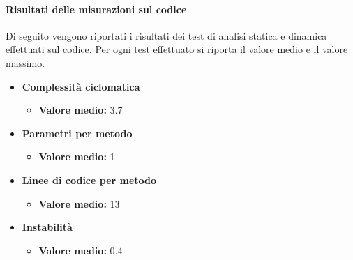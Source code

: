 \paragraph{Risultati delle misurazioni sul codice}
Di seguito vengono riportati i risultati dei test di analisi statica e dinamica effettuati sul codice.
Per ogni test effettuato si riporta il valore medio e il valore massimo.
\begin{itemize}
\item{\textbf{Complessità ciclomatica}}
\begin{itemize}
\item{\textbf{Valore medio: }}3.7
\end{itemize}
\item{\textbf{Parametri per metodo}}
\begin{itemize}
\item{\textbf{Valore medio: }}1
\end{itemize}
\item{\textbf{Linee di codice per metodo}}
\begin{itemize}
\item{\textbf{Valore medio: }}13
\end{itemize}
\item{\textbf{Instabilità}}
\begin{itemize}
\item{\textbf{Valore medio: }}0.4
\end{itemize}
\end{itemize}

